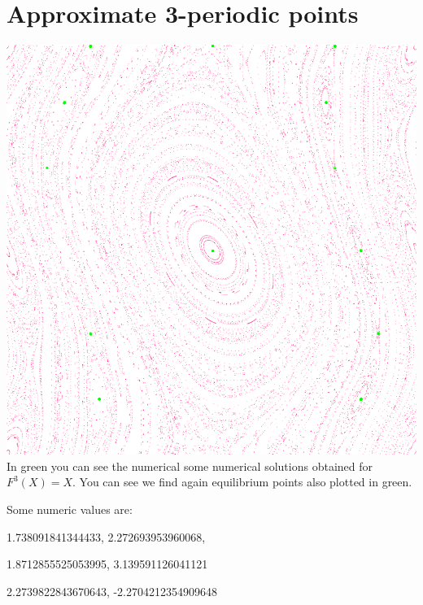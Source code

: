 \documentclass[]{scrartcl}
\begin{document}
\section{Approximate 3-periodic points}
\includegraphics[width=\linewidth]{k3.png}
In green you can see the numerical some numerical solutions obtained for $F^3(X) = X$. You can see we find again equilibrium points also plotted in green.

Some numeric values are:

1.738091841344433, 2.272693953960068,

1.8712855525053995, 3.139591126041121

2.2739822843670643, -2.2704212354909648
\end{document}
